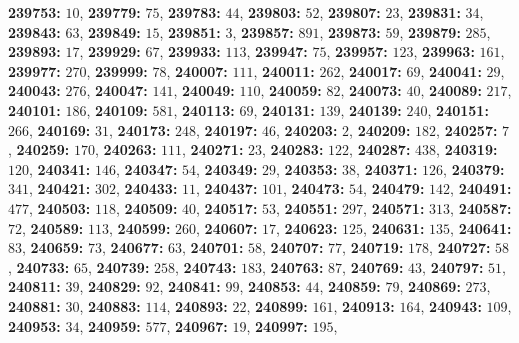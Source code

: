 \textsf{\bfseries 239753:} $10$, \textsf{\bfseries 239779:} $75$, \textsf{\bfseries 239783:} $44$, \textsf{\bfseries 239803:} $52$, \textsf{\bfseries 239807:} $23$, \textsf{\bfseries 239831:} $34$, \textsf{\bfseries 239843:} $63$, \textsf{\bfseries 239849:} $15$, \textsf{\bfseries 239851:} $3$, \textsf{\bfseries 239857:} $891$, \textsf{\bfseries 239873:} $59$, \textsf{\bfseries 239879:} $285$, \textsf{\bfseries 239893:} $17$, \textsf{\bfseries 239929:} $67$, \textsf{\bfseries 239933:} $113$, \textsf{\bfseries 239947:} $75$, \textsf{\bfseries 239957:} $123$, \textsf{\bfseries 239963:} $161$, \textsf{\bfseries 239977:} $270$, \textsf{\bfseries 239999:} $78$, \textsf{\bfseries 240007:} $111$, \textsf{\bfseries 240011:} $262$, \textsf{\bfseries 240017:} $69$, \textsf{\bfseries 240041:} $29$, \textsf{\bfseries 240043:} $276$, \textsf{\bfseries 240047:} $141$, \textsf{\bfseries 240049:} $110$, \textsf{\bfseries 240059:} $82$, \textsf{\bfseries 240073:} $40$, \textsf{\bfseries 240089:} $217$, \textsf{\bfseries 240101:} $186$, \textsf{\bfseries 240109:} $581$, \textsf{\bfseries 240113:} $69$, \textsf{\bfseries 240131:} $139$, \textsf{\bfseries 240139:} $240$, \textsf{\bfseries 240151:} $266$, \textsf{\bfseries 240169:} $31$, \textsf{\bfseries 240173:} $248$, \textsf{\bfseries 240197:} $46$, \textsf{\bfseries 240203:} $2$, \textsf{\bfseries 240209:} $182$, \textsf{\bfseries 240257:} $7$, \textsf{\bfseries 240259:} $170$, \textsf{\bfseries 240263:} $111$, \textsf{\bfseries 240271:} $23$, \textsf{\bfseries 240283:} $122$, \textsf{\bfseries 240287:} $438$, \textsf{\bfseries 240319:} $120$, \textsf{\bfseries 240341:} $146$, \textsf{\bfseries 240347:} $54$, \textsf{\bfseries 240349:} $29$, \textsf{\bfseries 240353:} $38$, \textsf{\bfseries 240371:} $126$, \textsf{\bfseries 240379:} $341$, \textsf{\bfseries 240421:} $302$, \textsf{\bfseries 240433:} $11$, \textsf{\bfseries 240437:} $101$, \textsf{\bfseries 240473:} $54$, \textsf{\bfseries 240479:} $142$, \textsf{\bfseries 240491:} $477$, \textsf{\bfseries 240503:} $118$, \textsf{\bfseries 240509:} $40$, \textsf{\bfseries 240517:} $53$, \textsf{\bfseries 240551:} $297$, \textsf{\bfseries 240571:} $313$, \textsf{\bfseries 240587:} $72$, \textsf{\bfseries 240589:} $113$, \textsf{\bfseries 240599:} $260$, \textsf{\bfseries 240607:} $17$, \textsf{\bfseries 240623:} $125$, \textsf{\bfseries 240631:} $135$, \textsf{\bfseries 240641:} $83$, \textsf{\bfseries 240659:} $73$, \textsf{\bfseries 240677:} $63$, \textsf{\bfseries 240701:} $58$, \textsf{\bfseries 240707:} $77$, \textsf{\bfseries 240719:} $178$, \textsf{\bfseries 240727:} $58$, \textsf{\bfseries 240733:} $65$, \textsf{\bfseries 240739:} $258$, \textsf{\bfseries 240743:} $183$, \textsf{\bfseries 240763:} $87$, \textsf{\bfseries 240769:} $43$, \textsf{\bfseries 240797:} $51$, \textsf{\bfseries 240811:} $39$, \textsf{\bfseries 240829:} $92$, \textsf{\bfseries 240841:} $99$, \textsf{\bfseries 240853:} $44$, \textsf{\bfseries 240859:} $79$, \textsf{\bfseries 240869:} $273$, \textsf{\bfseries 240881:} $30$, \textsf{\bfseries 240883:} $114$, \textsf{\bfseries 240893:} $22$, \textsf{\bfseries 240899:} $161$, \textsf{\bfseries 240913:} $164$, \textsf{\bfseries 240943:} $109$, \textsf{\bfseries 240953:} $34$, \textsf{\bfseries 240959:} $577$, \textsf{\bfseries 240967:} $19$, \textsf{\bfseries 240997:} $195$, 

